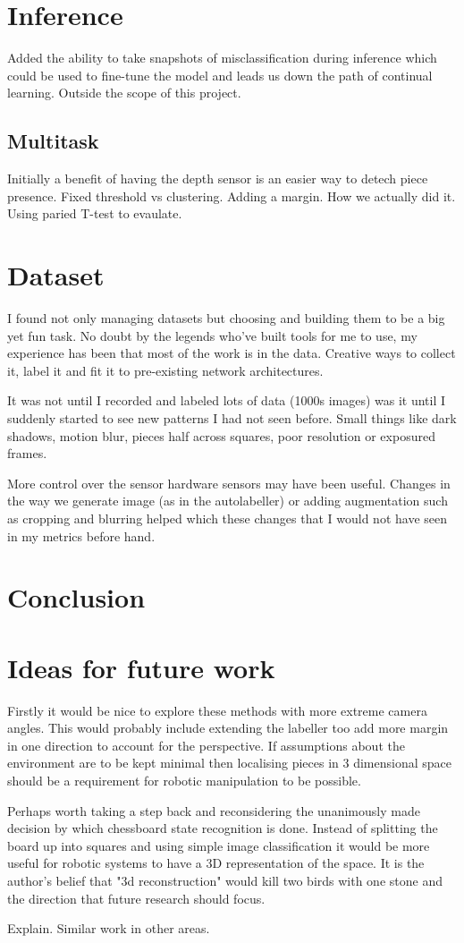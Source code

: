 \section{Inference}
Added the ability to take snapshots of misclassification during inference which could be used to fine-tune the model and leads us down the 
path of continual learning.  Outside the scope of this project.

\subsection{Multitask}
Initially a benefit of having the depth sensor is an easier way to detech piece presence.  
Fixed threshold vs clustering.  Adding a margin.  How we actually did it.
Using paried T-test to evaulate.

\section{Dataset}
I found not only managing datasets but choosing and building them to be a big yet fun task.  No doubt by the legends who've built tools for me to use,
my experience has been that most of the work is in the data. Creative ways to collect it, label it and fit it to pre-existing network architectures.  

It was not until I recorded and labeled lots of data (1000s images) was it until I suddenly started to see new patterns I had not seen before.  Small 
things like dark shadows, motion blur, pieces half across squares, poor resolution or exposured frames.

More control over the sensor hardware sensors may have been useful.  Changes in the way we generate image (as in the autolabeller) or
adding augmentation such as cropping and blurring helped which these changes that I would not have seen in my metrics before hand.

\section{Conclusion}



\section{Ideas for future work}
Firstly it would be nice to explore these methods with more extreme camera angles.  This would probably include extending the labeller too add more 
margin in one direction to account for the perspective. If assumptions about the environment are to be kept minimal
then localising pieces in 3 dimensional space should be a requirement for robotic manipulation to be possible.

Perhaps worth taking a step back and reconsidering the unanimously made decision by which chessboard state recognition is done.  Instead of splitting 
the board up into squares and using simple image classification it would be more useful for robotic systems to have a 3D representation of the space.
It is the author's belief that "3d reconstruction" would kill two birds with one stone and the direction that future research should focus. 

Explain.  Similar work in other areas.